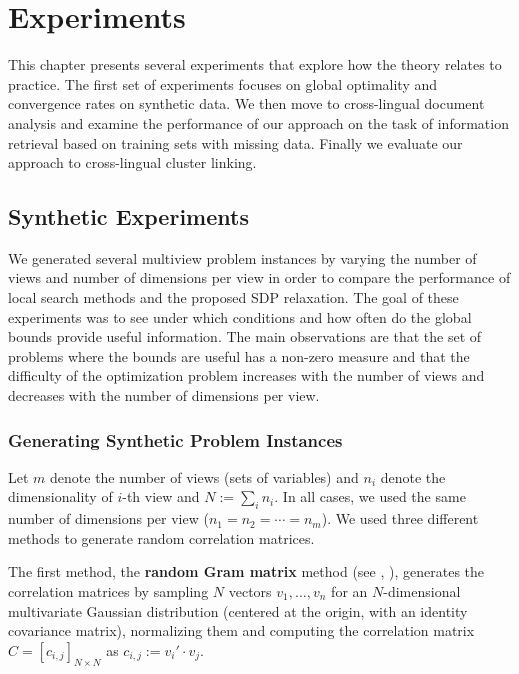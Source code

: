 %
\chapter{Experiments}\label{chap:experiments}

This chapter presents several experiments that explore how the theory relates
to practice. The first set of experiments focuses on global optimality
and convergence rates on synthetic data. We then move to
cross-lingual document analysis and examine the performance
of our approach on the task of information retrieval based
on training sets with missing data. Finally we evaluate our
approach to cross-lingual cluster linking.

\section{Synthetic Experiments}\label{chap:experiments:synthetic}
We generated several multiview problem instances by varying the number
of views and number of dimensions per view in order to
compare the performance of local search methods and the proposed
SDP relaxation. The goal of these experiments was to see
under which conditions and how often do the global bounds
provide useful information. The main observations are that the
set of problems where the bounds are useful has a non-zero
measure and that the difficulty of the optimization problem
increases with the number of views and decreases with the
number of dimensions per view.

\subsection{Generating Synthetic Problem Instances}

Let $m$ denote the number of views (sets of variables) and
$n_i$ denote the dimensionality of $i$-th
view and $N := \sum_i n_i$. In all cases, we used the same number
of dimensions per view ($n_1 = n_2 = \cdots = n_m$). We used
three different methods to generate random correlation matrices.

The first method, the \textbf{random Gram matrix} method (see
\cite{Holmes:1991:RCM:105724.105730}, \cite{Bendel_Mickey_78}),
generates the correlation matrices by sampling $N$ vectors $v_1,
\ldots, v_n$ for an $N$-dimensional multivariate Gaussian
distribution (centered at the origin, with an identity covariance
matrix), normalizing them and computing the correlation matrix $C
= \left[c_{i,j}\right]_{N \times N}$ as $c_{i,j} := v_i' \cdot v_j$.

